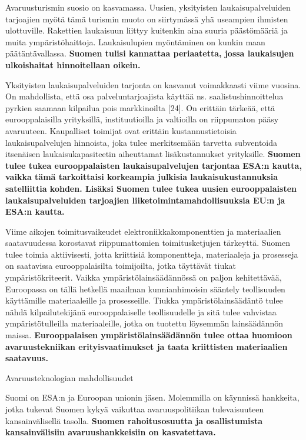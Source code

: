 Avaruusturismin suosio on kasvamassa. Uusien, yksityisten
laukaisupalveluiden tarjoajien myötä tämä turismin muoto on siirtymässä
yhä useampien ihmisten ulottuville. Rakettien laukaisuun liittyy
kuitenkin aina suuria päästömääriä ja muita ympäristöhaittoja.
Laukaisulupien myöntäminen on kunkin maan päätäntävallassa.
\textbf{Suomen tulisi kannattaa periaatetta, jossa laukaisujen
ulkoishaitat hinnoitellaan oikein. }

Yksityisten laukaisupalveluiden tarjonta on kasvanut voimakkaasti viime
vuosina. On mahdollista, että osa palveluntarjoajista käyttää ns.
saalistushinnoittelua pyrkien saamaan kilpailua pois markkinoilta
{[}24{]}. On erittäin tärkeää, että eurooppalaisilla yrityksillä,
instituutioilla ja valtioilla on riippumaton pääsy avaruuteen.
Kaupalliset toimijat ovat erittäin kustannustietoisia laukaisupalvelujen
hinnoista, joka tulee merkitsemään tarvetta subventoida itsenäisen
laukaisukapasiteetin aiheuttamat lisäkustannukset yrityksille.
\textbf{Suomen tulee tukea eurooppalaisten laukaisupalvelujen tarjontaa
ESA:n kautta, vaikka tämä tarkoittaisi korkeampia julkisia
laukaisukustannuksia satelliittia kohden. Lisäksi Suomen tulee tukea
uusien eurooppalaisten laukaisupalveluiden tarjoajien
liiketoimintamahdollisuuksia EU:n ja ESA:n kautta. }

Viime aikojen toimitusvaikeudet elektroniikkakomponenttien ja
materiaalien saatavuudessa korostavat riippumattomien toimitusketjujen
tärkeyttä. Suomen tulee toimia aktiivisesti, jotta kriittisiä
komponentteja, materiaaleja ja prosesseja on saatavissa eurooppalaisilta
toimijoilta, jotka täyttävät tiukat ympäristökriteerit. Vaikka
ympäristölainsäädännössä on paljon kehitettävää, Euroopassa on tällä
hetkellä maailman kunnianhimoisin sääntely teollisuuden käyttämille
materiaaleille ja prosesseille. Tiukka ympäristölainsäädäntö tulee nähdä
kilpailutekijänä eurooppalaiselle teollisuudelle ja sitä tulee vahvistaa
ympäristötulleilla materiaaleille, jotka on tuotettu löysemmän
lainsäädännön maissa. \textbf{Eurooppalaisen ympäristölainsäädännön
tulee ottaa huomioon avaruustekniikan erityisvaatimukset ja taata
kriittisten materiaalien saatavuus.}

\protect\hypertarget{anchor-5}{}{}Avaruusteknologian mahdollisuudet

Suomi on ESA:n ja Euroopan unionin jäsen. Molemmilla on käynnissä
hankkeita, jotka tukevat Suomen kykyä vaikuttaa avaruuspolitiikan
tulevaisuuteen kansainvälisellä tasolla. \textbf{Suomen rahoitusosuutta
ja osallistumista kansainvälisiin avaruushankkeisiin on kasvatettava.}

